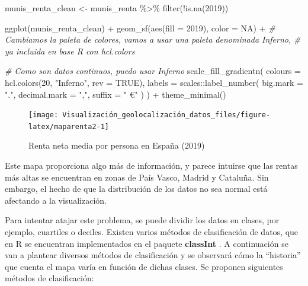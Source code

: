 \documentclass[
]{report}
\newenvironment{Shaded}{\begin{snugshade}}{\end{snugshade}}
\newcommand{\AttributeTok}[1]{\textcolor[rgb]{0.77,0.63,0.00}{#1}}
\newcommand{\CommentTok}[1]{\textcolor[rgb]{0.56,0.35,0.01}{\textit{#1}}}
\newcommand{\ConstantTok}[1]{\textcolor[rgb]{0.00,0.00,0.00}{#1}}
\newcommand{\DecValTok}[1]{\textcolor[rgb]{0.00,0.00,0.81}{#1}}
\newcommand{\FunctionTok}[1]{\textcolor[rgb]{0.00,0.00,0.00}{#1}}
\newcommand{\NormalTok}[1]{#1}
\newcommand{\OtherTok}[1]{\textcolor[rgb]{0.56,0.35,0.01}{#1}}
\newcommand{\SpecialCharTok}[1]{\textcolor[rgb]{0.00,0.00,0.00}{#1}}
\newcommand{\StringTok}[1]{\textcolor[rgb]{0.31,0.60,0.02}{#1}}
\theoremstyle{definition}
\theoremstyle{definition}
\theoremstyle{definition}
\theoremstyle{definition}
\theoremstyle{remark}
\begin{document}
\begin{Shaded}
\begin{Highlighting}[]

\NormalTok{munis\_renta\_clean }\OtherTok{\textless{}{-}}\NormalTok{ munis\_renta }\SpecialCharTok{\%\textgreater{}\%} \FunctionTok{filter}\NormalTok{(}\SpecialCharTok{!}\FunctionTok{is.na}\NormalTok{(}\StringTok{\textasciigrave{}}\AttributeTok{2019}\StringTok{\textasciigrave{}}\NormalTok{))}

\FunctionTok{ggplot}\NormalTok{(munis\_renta\_clean) }\SpecialCharTok{+}
  \FunctionTok{geom\_sf}\NormalTok{(}\FunctionTok{aes}\NormalTok{(}\AttributeTok{fill =} \StringTok{\textasciigrave{}}\AttributeTok{2019}\StringTok{\textasciigrave{}}\NormalTok{), }\AttributeTok{color =} \ConstantTok{NA}\NormalTok{) }\SpecialCharTok{+}
  \CommentTok{\# Cambiamos la paleta de colores, vamos a usar una paleta denominada Inferno,}
  \CommentTok{\# ya incluida en base R con hcl.colors}

  \CommentTok{\# Como son datos continuos, puedo usar Inferno}
  \FunctionTok{scale\_fill\_gradientn}\NormalTok{(}
    \AttributeTok{colours =} \FunctionTok{hcl.colors}\NormalTok{(}\DecValTok{20}\NormalTok{, }\StringTok{"Inferno"}\NormalTok{, }\AttributeTok{rev =} \ConstantTok{TRUE}\NormalTok{),}
    \AttributeTok{labels =}\NormalTok{ scales}\SpecialCharTok{::}\FunctionTok{label\_number}\NormalTok{(}
      \AttributeTok{big.mark =} \StringTok{"."}\NormalTok{,}
      \AttributeTok{decimal.mark =} \StringTok{","}\NormalTok{,}
      \AttributeTok{suffix =} \StringTok{" €"}
\NormalTok{    )}
\NormalTok{  ) }\SpecialCharTok{+}
  \FunctionTok{theme\_minimal}\NormalTok{()}
\end{Highlighting}
\end{Shaded}

\begin{figure}

{\centering \texttt{[image: Visualización\_geolocalización\_datos\_files/figure-latex/maparenta2-1]} 

}

\caption{Renta neta media por persona en España (2019)}\label{fig:maparenta2}
\end{figure}

Este mapa proporciona algo más de información, y parece intuirse que las rentas
más altas se encuentran en zonas de País Vasco, Madrid y Cataluña. Sin embargo,
el hecho de que la distribución de los datos no sea normal está afectando a la
visualización.

Para intentar atajar este problema, se puede dividir los datos en clases, por
ejemplo, cuartiles o deciles. Existen varios métodos de clasificación de datos,
que en R se encuentran implementados en el paquete \textbf{classInt} \citep{R-classint}. A
continuación se van a plantear diversos métodos de clasificación y se observará
cómo la ``historia'' que cuenta el mapa varía en función de dichas clases. Se
proponen siguientes métodos de clasificación:
\end{document}
